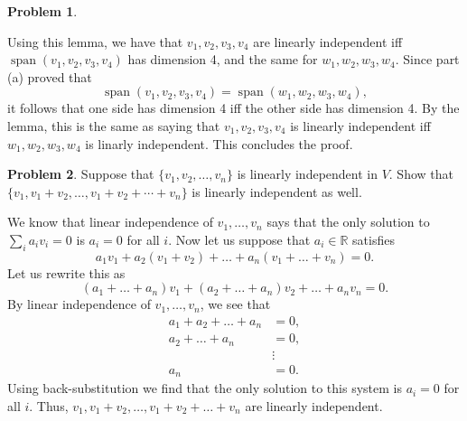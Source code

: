 \documentclass[11pt,oneside]{amsart}
\theoremstyle{definition}
\newtheorem{problem}{Problem}
\newcommand{\bR}{\mathbb{R}}
\DeclareMathOperator{\Span}{span}
\begin{document}
\begin{problem}
\begin{enumerate}[(a)]
\begin{solution}
                Using this lemma, we have that $v_1,v_2,v_3,v_4$ are linearly independent iff $\Span(v_1,v_2,v_3,v_4)$ has dimension 4, and the same for $w_1,w_2,w_3,w_4$. Since part (a) proved that
                \[\Span(v_1,v_2,v_3,v_4)=\Span(w_1,w_2,w_3,w_4),\]
                it follows that one side has dimension 4 iff the other side has dimension 4. By the lemma, this is the same as saying that $v_1,v_2,v_3,v_4$ is linearly independent iff $w_1,w_2,w_3,w_4$ is linarly independent. This concludes the proof.
            \end{solution}
        \end{enumerate}
    \end{problem}

    \begin{problem}
        Suppose that $\{v_1,v_2,\dots,v_n\}$ is linearly independent in $V$. Show that $\{v_1,v_1+v_2,\dots,v_1+v_2+\cdots+v_n\}$ is linearly independent as well.
    \end{problem}
    \begin{solution}
        We know that linear independence of $v_1,\dots,v_n$ says that the only solution to $\sum_i a_iv_i=0$ is $a_i=0$ for all $i$. Now let us suppose that $a_i\in\bR$ satisfies
        \[a_1v_1+a_2(v_1+v_2)+\dots+a_n(v_1+\dots+v_n)=0.\]
        Let us rewrite this as
        \[(a_1+\dots+a_n)v_1+(a_2+\dots+a_n)v_2+\dots+a_nv_n=0.\]
        By linear independence of $v_1,\dots,v_n$, we see that
        \begin{align*}
            a_1+a_2+\dots+a_n &=0,\\
            a_2+\dots+a_n &=0,\\
            &\vdots\\
            a_n &=0.
        \end{align*}
        Using back-substitution we find that the only solution to this system is $a_i=0$ for all $i$. Thus, $v_1,v_1+v_2,\dots,v_1+v_2+\dots+v_n$ are linearly independent.
    \end{solution}
\end{document}
